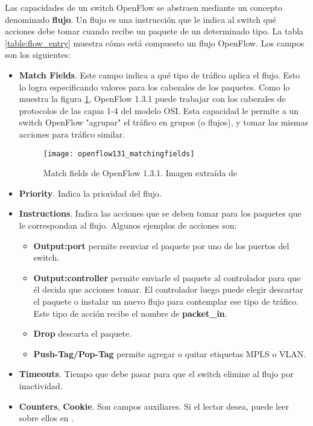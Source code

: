 Las capacidades de un switch OpenFlow se abstraen mediante un concepto denominado \textbf{flujo}. Un flujo es una instrucción que le indica al switch qué acciones debe tomar cuando recibe un paquete de un determinado tipo. La tabla \ref{table:flow_entry} muestra cómo está compuesto un flujo OpenFlow. Los campos son los siguientes:
\begin{itemize}
	\item \textbf{Match Fields}. Este campo indica a qué tipo de tráfico aplica el flujo. Esto lo logra especificando valores para los cabezales de los paquetes. Como lo muestra la figura \ref{fig:openflow_matching_fields}, OpenFlow 1.3.1 puede trabajar con los cabezales de protocolos de las capas 1-4 del modelo OSI. Esta capacidad le permite a un switch OpenFlow "agrupar" el tráfico en grupos (o flujos), y tomar las mismas acciones para tráfico similar.
	
	\begin{figure}[H] 
		\centering    
		\texttt{[image: openflow131\_matchingfields]}
		\caption{Match fields de OpenFlow 1.3.1. Imagen extraída de \cite{proyecto-rrap}}
		\label{fig:openflow_matching_fields}
	\end{figure}

	\item \textbf{Priority}. Indica la prioridad del flujo.
	\item \textbf{Instructions}. Indica las acciones que se deben tomar para los paquetes que le correspondan al flujo. Algunos ejemplos de acciones son:
		\begin{itemize}
			\item \textbf{Output:port} permite reenviar el paquete por uno de los puertos del switch.
			\item \textbf{Output:controller} permite enviarle el paquete al controlador para que él decida que acciones tomar. El controlador luego puede elegir descartar el paquete o instalar un nuevo flujo para contemplar ese tipo de tráfico. Este tipo de acción recibe el nombre de \textbf{packet\_in}.
			\item \textbf{Drop} descarta el paquete.
			\item \textbf{Push-Tag/Pop-Tag} permite agregar o quitar etiquetas MPLS o VLAN.
		\end{itemize}
	\item \textbf{Timeouts}. Tiempo que debe pasar para que el switch elimine al flujo por inactividad.
	\item \textbf{Counters}, \textbf{Cookie}. Son campos auxiliares. Si el lector desea, puede leer sobre ellos en \cite{openflow-1.3.1}.
\end{itemize}

